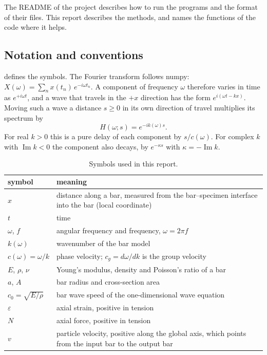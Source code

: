 \documentclass[11pt,a4paper,numbers=noenddot,abstract=true]{scrartcl}
\DeclareMathOperator{\Imag}{Im}
\begin{document}
The README of the project describes how to run the programs and the format of their files. This report describes
the methods, and names the functions of the code where it helps.

\subsection{Notation and conventions}
\label{sec:notation}

 defines the symbols. The Fourier transform follows numpy:
$X(\omega) = \sum_n x(t_n)\, e^{-i\omega t_n}$. A component of frequency $\omega$ therefore varies in time as
$e^{+i\omega t}$, and a wave that travels in the $+x$ direction has the form $e^{i(\omega t - kx)}$. Moving such a
wave a distance $s \ge 0$ in its own direction of travel multiplies its spectrum by
\begin{equation}
  H(\omega; s) = e^{-i k(\omega) s}.
  \label{eq:propagator}
\end{equation}
For real $k > 0$ this is a pure delay of each component by $s / c(\omega)$. For complex $k$ with $\Imag k < 0$ the
component also decays, by $e^{-\kappa s}$ with $\kappa = -\Imag k$.

\begin{table}[htbp]
\centering
\caption{Symbols used in this report.}
\label{tab:notation}
\begin{tabularx}{\textwidth}{lX}
\toprule
symbol & meaning \\
\midrule
$x$ & distance along a bar, measured from the bar--specimen interface into the bar (local coordinate) \\
$t$ & time \\
$\omega$, $f$ & angular frequency and frequency, $\omega = 2\pi f$ \\
$k(\omega)$ & wavenumber of the bar model \\
$c(\omega) = \omega / k$ & phase velocity; $c_g = d\omega / dk$ is the group velocity \\
$E$, $\rho$, $\nu$ & Young's modulus, density and Poisson's ratio of a bar \\
$a$, $A$ & bar radius and cross-section area \\
$c_0 = \sqrt{E/\rho}$ & bar wave speed of the one-dimensional wave equation \\
$\varepsilon$ & axial strain, positive in tension \\
$N$ & axial force, positive in tension \\
$v$ & particle velocity, positive along the global axis, which points from the input bar to the output bar \\
\bottomrule
\end{tabularx}
\end{table}
\end{document}
